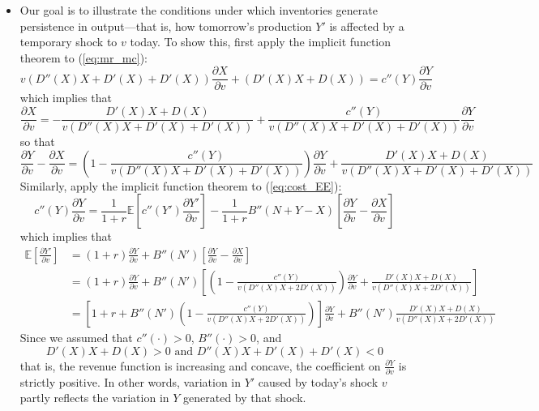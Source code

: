 \documentclass[12pt]{article}
\begin{document}
\begin{itemize}
\item Our goal is to illustrate the conditions under which inventories generate persistence in output---that is, how tomorrow's production $Y'$ is affected by a temporary shock to $v$ today. To show this, first apply the implicit function theorem to (\ref{eq:mr_mc}):
\[v(D''(X)X + D'(X) + D'(X))\frac{\partial X}{\partial v} + (D'(X) X + D(X)) = c''(Y) \frac{\partial Y}{\partial v }\]
which implies that
\[\frac{\partial X}{\partial v} = - \frac{D'(X) X + D(X)}{v (D''(X)X + D'(X) + D'(X))} +\frac{c''(Y)}{v(D''(X)X + D'(X) + D'(X))} \frac{\partial Y}{\partial v}\]
so that
\[\frac{\partial Y}{\partial v} - \frac{\partial X}{\partial v} = \left(1 - \frac{c''(Y)}{v(D''(X)X + D'(X) + D'(X))}\right) \frac{\partial Y}{\partial v} + \frac{D'(X) X + D(X)}{v (D''(X)X + D'(X) + D'(X))}\]
Similarly, apply the implicit function theorem to (\ref{eq:cost_EE}):
\[c''(Y)\frac{\partial Y}{\partial v} = \frac{1}{1+r} \mathbb{E}\left[c''(Y') \frac{\partial Y'}{\partial v}\right] - \frac{1}{1+r}B''(N + Y - X) \left[\frac{\partial Y}{\partial v} - \frac{\partial X}{\partial v}\right]\]
which implies that
\begin{align}
	\mathbb{E}\left[\frac{\partial Y'}{\partial v}\right] &= (1+r)\frac{\partial Y}{\partial v} + B''(N') \left[\frac{\partial Y}{\partial v} - \frac{\partial X}{\partial v}\right] \nonumber \\
	& = (1+r)\frac{\partial Y}{\partial v} + B''(N')\left[\left(1 - \frac{c''(Y)}{v(D''(X)X +2 D'(X) )}\right) \frac{\partial Y}{\partial v} + \frac{D'(X) X + D(X)}{v (D''(X)X + 2D'(X))}\right] \nonumber \\
	& = \left[1+r + B''(N') \left(1 - \frac{c''(Y)}{v(D''(X)X +2 D'(X) )}\right)  \right] \frac{\partial Y}{\partial v} + B''(N')\frac{D'(X) X + D(X)}{v (D''(X)X + 2D'(X))}
\end{align}
Since we assumed that $c''(\cdot) > 0$, $B''(\cdot) > 0$, and 
\[D'(X) X + D(X) > 0 \text{ and } D''(X) X + D'(X) + D'(X) < 0\]
that is, the revenue function is increasing and concave, the coefficient on $\frac{\partial Y}{\partial v}$ is strictly positive. In other words, variation in $Y'$ caused by today's shock $v$ partly reflects the variation in $Y$ generated by that shock.

\end{itemize}
%
\end{document}
